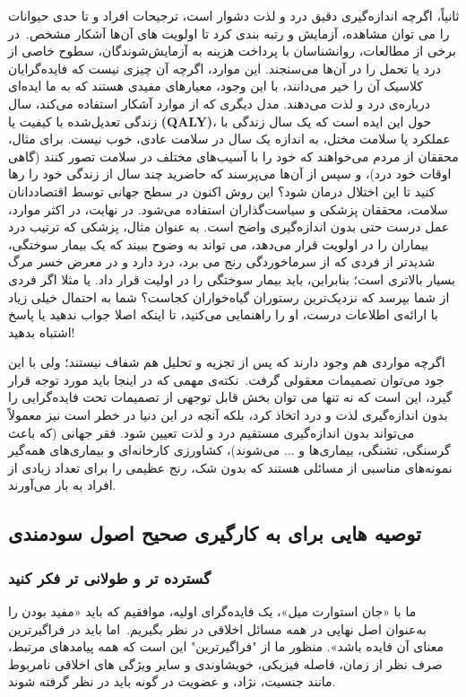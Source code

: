 \documentclass[12pt,oneside]{book}
\begin{document}
    ثانیاً، اگرچه اندازه‌گیری دقیق درد و لذت دشوار است، ترجیحات افراد و تا حدی حیوانات را می توان مشاهده، آزمایش و رتبه بندی کرد تا اولویت های آن‌ها آشکار مشخص.\     در برخی از مطالعات، روانشناسان با پرداخت هزینه به آزمایش‌شوندگان، سطوح خاصی از درد یا تحمل را در آن‌ها می‌سنجند.
    این موارد، اگرچه آن چیزی نیست که فایده‌گرایان کلاسیک آن را خیر می‌دانند، با این وجود، معیارهای مفیدی هستند که به ما ایده‌ای درباره‌ی درد و لذت می‌دهند.
    مدل دیگری که از موارد آشکار استفاده می‌کند، سال زندگی تعدیل‌شده با کیفیت یا \textenglish{\textbf{(QALY)}}، حول این ایده است که یک سال زندگی با عملکرد یا سلامت مختل، به اندازه یک سال در سلامت عادی، خوب نیست.
    برای مثال، محققان از مردم می‌خواهند که خود را با آسیب‌های مختلف در سلامت تصور کنند (گاهی اوقات خود درد)، و سپس از آن‌ها می‌پرسند که حاضرید چند سال از زندگی خود را رها کنید تا این اختلال درمان شود؟ این روش اکنون در سطح جهانی توسط اقتصاددانان سلامت، محققان پزشکی و سیاست‌گذاران استفاده می‌شود.
    در نهایت، در اکثر موارد، عمل درست حتی بدون اندازه‌گیری واضح است.
    به عنوان مثال، پزشکی که ترتیب درد بیماران را در اولویت قرار می‌دهد، می تواند به وضوح ببیند که یک بیمار سوختگی، شدیدتر از فردی که از سرماخوردگی رنج می برد، درد دارد و در معرض خسر مرگ بسیار بالاتری است؛ بنابراین، باید بیمار سوختگی را در اولیت قرار داد.
    یا مثلا اگر فردی از شما بپرسد که نزدیک‌ترین رستوران گیاه‌خواران کجاست؟ شما به احتمال خیلی زیاد با ارائه‌ی اطلاعات درست، او را راهنمایی می‌کنید، تا اینکه اصلا جواب ندهید یا پاسخ اشتباه بدهید!

    اگرچه مواردی هم وجود دارند که پس از تجزیه و تحلیل هم شفاف نیستند؛ ولی با این جود می‌توان تصمیمات معقولی گرفت.\     نکته‌ی مهمی که در اینجا باید مورد توجه قرار گیرد، این است که نه تنها می توان بخش قابل توجهی از تصمیمات تحت فایده‌گرایی را بدون اندازه‌گیری لذت و درد اتخاذ کرد، بلکه آنچه در این دنیا در خطر است نیز معمولاً می‌تواند بدون اندازه‌گیری مستقیم درد و لذت تعیین شود.
    فقر جهانی (که باعث گرسنگی، تشنگی، بیماری‌ها و ... می‌شوند)، کشاورزی کارخانه‌ای و بیماری‌های همه‌گیر نمونه‌های مناسبی از مسائلی هستند که بدون شک، رنج عظیمی را برای تعداد زیادی از افراد به بار می‌آورند.


    \subsection*{توصیه هایی برای به کارگیری صحیح اصول سودمندی}


    \subsubsection*{گسترده تر و طولانی تر فکر کنید}
    ما با «جان استوارت میل»، یک فایده‌گرای اولیه، موافقیم که باید «مفید بودن را به‌عنوان اصل نهایی در همه مسائل اخلاقی در نظر بگیریم.\     اما باید در فراگیرترین معنای آن فایده باشد».
    منظور ما از "فراگیرترین" این است که همه پیامدهای مرتبط، صرف نظر از زمان، فاصله فیزیکی، خویشاوندی و سایر ویژگی های اخلاقی نامربوط مانند جنسیت، نژاد، و عضویت در گونه باید در نظر گرفته شوند.
\end{document}
